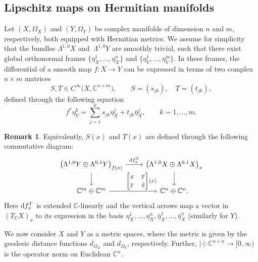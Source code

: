 \documentclass[pdftex]{sigma}
\numberwithin{equation}{section}
\theoremstyle{definition}
\newtheorem{Remark}[Theorem]{Remark}
\newcommand{\C}{\mathbb{C}} %
\newcommand{\1}{{\bf 1}}
\begin{document}
\subsection{Lipschitz maps on Hermitian manifolds}\label{s_metriccx2}
\sloppy Let $(X,\Omega_X)$ and $(Y,\Omega_Y)$ be complex manifolds of dimension $n$ and $m$, respectively, both equipped with Hermitian metrics.
We assume for simplicity that the bundles $\Lambda^{1,0}X$ and~$\Lambda^{1,0}Y$ are smoothly trivial, such that there exist global orthonormal frames
$\big\{\eta_X^1,\dots,\eta_X^n\big\}$ and $\big\{\eta_Y^1,\dots,\eta_Y^m\big\}$.
In these frames, the differential of a smooth map $f\colon X\rightarrow Y$ can be expressed in terms of two complex $n\times m$ matrices
\begin{equation*}
S,T\in C^\infty\bigl(X,\C^{n\times m}\bigr),\qquad S=(s_{jk}),\quad T=(t_{jk}),
\end{equation*}
defined through the following equation
\begin{equation}\label{defst}
f^* \eta_Y^k = \sum_{j=1}^n s_{jk}\eta_X^j + t_{jk} \bar \eta_X^j,\qquad k=1,\dots, m.
\end{equation}

\begin{Remark}
Equivalently, $S(x)$ and $T(x)$ are defined through the following commutative diagram:
\begin{equation}
\label{commdiagram}
\begin{tikzcd}[ampersand replacement=\&]
\bigl(\Lambda^{1,0}Y\oplus \Lambda^{0,1}Y\bigr)_{f(x)}
\arrow{d} \arrow["{\rm d}f_x^T"]{r} \& \bigl(\Lambda^{1,0}X\oplus \Lambda^{0,1}X\bigr)_{x} \arrow{d}\\
\C^m\oplus \C^m \arrow{r}{\qquad~\begin{bmatrix}
S &\bar T\\
T & \bar S
\end{bmatrix}(x)} \&\C^n\oplus \C^n.
\end{tikzcd}
\end{equation}
Here ${\rm d}f_x^T$ is extended $\C$-linearly and the vertical arrows map a vector in $(T_\C X)_x$ to its expression in the basis $\eta_X^1,\dots, \eta_X^n,\bar \eta_X^1,\dots,\bar \eta_X^n$ (similarly for $Y$).
\end{Remark}

We now consider $X$ and $Y$ as a metric spaces, where the metric is given by the geodesic distance functions $d_{\Omega_X}$ and $d_{\Omega_Y}$, respectively. Further, $|\cdot|\colon \C^{n\times n}\rightarrow [0,\infty)$ is the operator norm on Euclidean $\C^n$.
\end{document}
